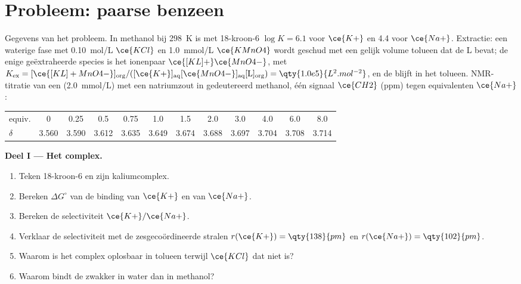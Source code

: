\section{Probleem: paarse benzeen}

\begin{problem}
\label{pb:b3:supramolecular:1}
Gegevens van het probleem. In methanol bij \qty{298}{K} is met 18-kroon-6
$\log K = 6.1$ voor $\ce{K+}$ en 4.4 voor $\ce{Na+}$. Extractie: een waterige fase met \qty{0.10}{mol/L} $\ce{KCl}$ en \qty{1.0}{mmol/L} $\ce{KMnO4}$ wordt geschud
met een gelijk volume tolueen dat de  L bevat; de enige
geëxtraheerde species is het ionenpaar $\ce{[KL]+}\ce{MnO4-}$, met
$K_{\mathrm{ex}} = [\ce{[KL]+MnO4-}]_{\mathrm{org}}/([\ce{K+}]_{\mathrm{aq}}[\ce{MnO4-}]_{\mathrm{aq}}[\mathrm L]_{\mathrm{org}}) = \qty{1.0e5}{L^2.mol^{-2}}$, en de  blijft in het tolueen. NMR-titratie van een
 (\qty{2.0}{mmol/L}) met een natriumzout in gedeutereerd methanol, één signaal $\ce{CH2}$
(ppm) tegen equivalenten $\ce{Na+}$:

\begin{center}\small
\begin{tabular}{l*{11}{c}}
\hline
equiv. & 0 & 0.25 & 0.5 & 0.75 & 1.0 & 1.5 & 2.0 & 3.0 & 4.0 & 6.0 & 8.0\\
$\delta$ & 3.560 & 3.590 & 3.612 & 3.635 & 3.649 & 3.674 & 3.688 & 3.697 & 3.704 & 3.708 & 3.714\\
\hline
\end{tabular}
\end{center}

\medskip\noindent\textbf{Deel I --- Het complex.}
\begin{enumerate}
  \item Teken 18-kroon-6 en zijn kaliumcomplex.
  \item Bereken $\Delta G^\circ$ van de binding van $\ce{K+}$ en van $\ce{Na+}$.
  \item Bereken de selectiviteit $\ce{K+}/\ce{Na+}$.
  \item Verklaar de selectiviteit met de zesgecoördineerde stralen $r(\ce{K+}) = \qty{138}{pm}$ en $r(\ce{Na+}) = \qty{102}{pm}$.
  \item Waarom is het complex oplosbaar in tolueen terwijl $\ce{KCl}$ dat niet is?
  \item Waarom bindt de  zwakker in water dan in methanol?
\end{enumerate}


\end{problem}

